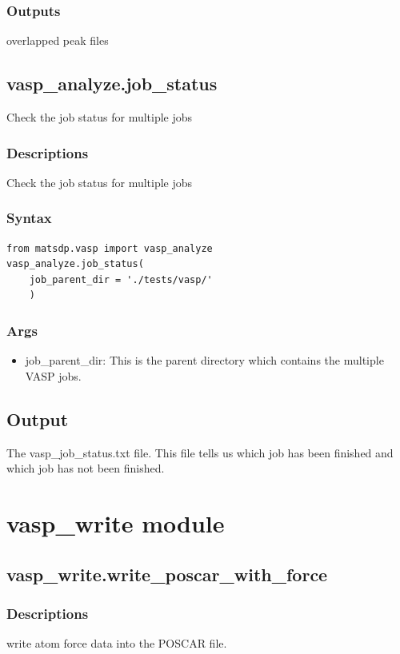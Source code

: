 \documentclass[12pt]{book}
\begin{document}
\subsubsection{Outputs}
overlapped peak files


\subsection{vasp\_analyze.job\_status}
Check the job status for multiple jobs

\subsubsection{Descriptions}
Check the job status for multiple jobs
\subsubsection{Syntax}
\begin{lstlisting}
from matsdp.vasp import vasp_analyze
vasp_analyze.job_status(
    job_parent_dir = './tests/vasp/'
    )
\end{lstlisting}
\subsubsection{Args}
\begin{itemize}
\item job\_parent\_dir: This is the parent directory which contains the multiple VASP jobs.
\end{itemize}

\subsection{Output}
The vasp\_job\_status.txt file. This file tells us which job has been finished and which job has not been finished.

\section{vasp\_write module}
\subsection{vasp\_write.write\_poscar\_with\_force}
\subsubsection{Descriptions}
write atom force data into the POSCAR file.
\end{document}

